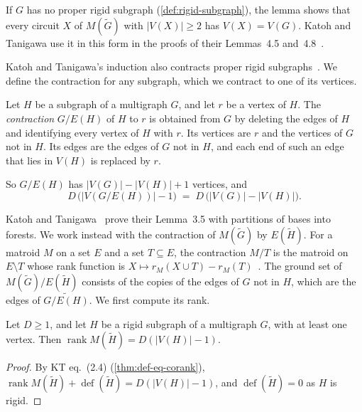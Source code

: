 If $G$ has no proper rigid subgraph (\cref{def:rigid-subgraph}), the
lemma shows that every circuit $X$ of $M(\tilde G)$ with
$|V(X)| \ge 2$ has $V(X) = V(G)$. Katoh and Tanigawa use it in this
form in the proofs of their Lemmas~4.5 and~4.8~\cite[pp.~663
and~666]{katohTanigawa2011}.

Katoh and Tanigawa's induction also contracts proper rigid
subgraphs~\cite[p.~659]{katohTanigawa2011}. We define the contraction
for any subgraph, which we contract to one of its vertices.

\begin{definition}
  \label{def:rigid-contraction}
  \leanok
  Let $H$ be a subgraph of a multigraph $G$, and let $r$ be a vertex of
  $H$. The \emph{contraction} $G/E(H)$ of $H$ to $r$ is obtained from
  $G$ by deleting the edges of $H$ and identifying every vertex of $H$
  with $r$. Its vertices are $r$ and the vertices of $G$ not in $H$. Its
  edges are the edges of $G$ not in $H$, and each end of such an edge
  that lies in $V(H)$ is replaced by $r$.
\end{definition}

So $G/E(H)$ has $|V(G)| - |V(H)| + 1$ vertices, and
\[
  D\,\bigl(|V(G/E(H))| - 1\bigr) \;=\; D\,\bigl(|V(G)| - |V(H)|\bigr).
\]

Katoh and Tanigawa~\cite[pp.~658--659]{katohTanigawa2011} prove their
Lemma~3.5 with partitions of bases into forests. We work instead with
the contraction of $M(\tilde G)$ by $E(\tilde H)$. For a matroid $M$ on
a set $E$ and a set $T \subseteq E$, the contraction $M/T$ is the
matroid on $E \setminus T$ whose rank function is
$X \mapsto r_M(X \cup T) - r_M(T)$~\cite[\S3.1 and
Proposition~3.1.6]{oxley2011}. The ground set of
$M(\tilde G)/E(\tilde H)$ consists of the copies of the edges of $G$
not in $H$, which are the edges of $\widetilde{G/E(H)}$. We first
compute its rank.

\begin{lemma}
  \label{lem:rigid-full-rank}
  \leanok
  Let $D \ge 1$, and let $H$ be a rigid subgraph of a multigraph $G$,
  with at least one vertex. Then
  $\operatorname{rank} M(\tilde H) = D(|V(H)| - 1)$.
\end{lemma}
\begin{proof}
  \leanok
  By KT eq.~(2.4) (\cref{thm:def-eq-corank}),
  $\operatorname{rank} M(\tilde H) + \operatorname{def}(\tilde H) =
  D(|V(H)| - 1)$, and $\operatorname{def}(\tilde H) = 0$ as $H$ is
  rigid.
\end{proof}

